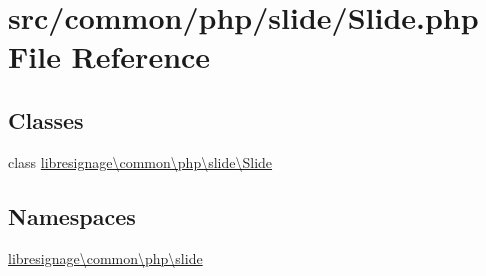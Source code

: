 \hypertarget{Slide_8php}{}\section{src/common/php/slide/\+Slide.php File Reference}
\label{Slide_8php}
\subsection*{Classes}
\begin{DoxyCompactItemize}
\item 
class \hyperlink{classlibresignage_1_1common_1_1php_1_1slide_1_1Slide}{libresignage\textbackslash{}common\textbackslash{}php\textbackslash{}slide\textbackslash{}\+Slide}
\end{DoxyCompactItemize}
\subsection*{Namespaces}
\begin{DoxyCompactItemize}
\item 
 \hyperlink{namespacelibresignage_1_1common_1_1php_1_1slide}{libresignage\textbackslash{}common\textbackslash{}php\textbackslash{}slide}
\end{DoxyCompactItemize}
